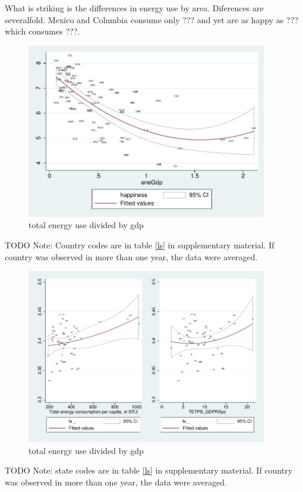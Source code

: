 \documentclass[10pt, letterpaper]{article}
\begin{document}
\begin{spacing}{1.4}
What is striking is the differences in energy use by area. Diferences are
severalfold. Mexico and Columbia
consume only ??? and yet are as happy as ??? which consumes ???.


\begin{figure}[H]
 \includegraphics[height=3in]{graphsAndTables/couWvsLsEnePerGdp.pdf}\centering
\caption{total energy use divided by gdp}\label{}
\end{figure}
{\scriptsize TODO Note: Country codes are in table \ref{ls} in supplementary
  material. If country was observed in more than one year, the data were averaged.}

\begin{figure}[H]
 \includegraphics[height=3in]{graphsAndTables/lfTETPBgdpLS.pdf}\centering
\caption{total energy use divided by gdp}\label{}
\end{figure}
{\scriptsize TODO Note: state codes are in table \ref{ls} in supplementary
  material. If country was observed in more than one year, the data were averaged.}


\end{spacing}
\end{document}
